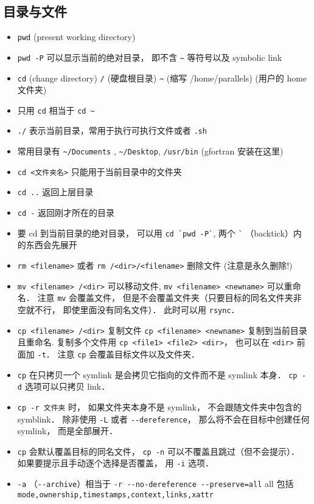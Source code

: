 \subsection{目录与文件}
\begin{itemize}
\item \verb`pwd` (present working directory)
\item \verb`pwd -P` 可以显示当前的绝对目录， 即不含 \verb`~` 等符号以及 symbolic link
\item \verb`cd` (change directory) \verb`/` (硬盘根目录) \verb`~` (缩写 /home/parallels) (用户的 home 文件夹)
\item 只用 \verb`cd` 相当于 \verb`cd ~`
\item \verb`./` 表示当前目录，常用于执行可执行文件或者 \verb`.sh`
\item 常用目录有 \verb`~/Documents` ,  \verb`~/Desktop`, \verb`/usr/bin` (gfortran 安装在这里)
\item \verb`cd <文件夹名>` 只能用于当前目录中的文件夹
\item \verb`cd ..` 返回上层目录
\item \verb`cd -` 返回刚才所在的目录
\item 要 cd 到当前目录的绝对目录， 可以用 \verb|cd `pwd -P`|, 两个 \verb|`| （backtick）内的东西会先展开
\item \verb`rm <filename>` 或者 \verb`rm /<dir>/<filename>` 删除文件  (注意是永久删除!)
\item \verb`mv <filename> /<dir>` 可以移动文件, \verb`mv <filename> <newname>` 可以重命名． 注意 \verb|mv| 会覆盖文件， 但是不会覆盖文件夹（只要目标的同名文件夹非空就不行， 即使里面没有同名文件）． 此时可以用 \verb|rsync|．
\item \verb`cp <filename> /<dir>` 复制文件 \verb`cp <filename> <newname>` 复制到当前目录且重命名. 复制多个文件用 \verb`cp <file1> <file2> <dir>`， 也可以在 \verb|<dir>| 前面加 \verb|-t|． 注意 \verb|cp| 会覆盖目标文件以及文件夹．
\item \verb|cp| 在只拷贝一个 symlink 是会拷贝它指向的文件而不是 symlink 本身． \verb|cp -d| 选项可以只拷贝 link．
\item \verb|cp -r 文件夹| 时， 如果文件夹本身不是 symlink， 不会跟随文件夹中包含的 symblink． 除非使用 \verb|-L| 或者 \verb|--dereference|， 那么将不会在目标中创建任何 symlink， 而是全部展开．
\item \verb|cp| 会默认覆盖目标的同名文件， \verb|cp -n| 可以不覆盖且跳过（但不会提示）． 如果要提示且手动逐个选择是否覆盖， 用 \verb|-i| 选项．
\item \verb|-a| （\verb|--archive|）相当于 \verb|-r --no-dereference --preserve=all| all 包括 \verb|mode,ownership,timestamps,context,links,xattr|

\end{itemize}
